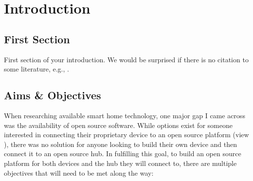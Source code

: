 \chapter{Introduction} \label{cha:intro}

\section{First Section} \label{sec:intro:first}

First section of your introduction. We would be surprised if there is
no citation to some literature, e.g.,
\cite{lulcs,PapacchiniCaminatiHu23}.

\section{Aims \& Objectives} \label{sec:intro:aims}
When researching available smart home technology, one major gap I came across 
was the availability of open source software. While options exist for someone 
interested in connecting their proprietary device to an open source platform 
(view ), there was no solution for anyone looking to 
build their own device and then connect it to an open source hub. In fulfilling 
this goal, to build an open source platform for both devices and the hub they 
will connect to, there are multiple objectives that will need to be met along 
the way:
